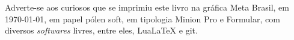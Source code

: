 \pagebreak

\ifodd\value{page}\blankpage\fi

\mbox{}\vfill


\begin{center}
		\begin{minipage}{.7\textwidth}\tiny\noindent{}
		\centering\tiny
		Adverte-se aos curiosos que se imprimiu este 
		livro na gráfica Meta Brasil, 
		em \today{}, em papel pólen soft, em tipologia Minion Pro e Formular, 
		com diversos \emph{softwares} livres, 
		entre eles, Lua\LaTeX{} e git.\\
		\par\medskip
		\end{minipage}
\end{center}